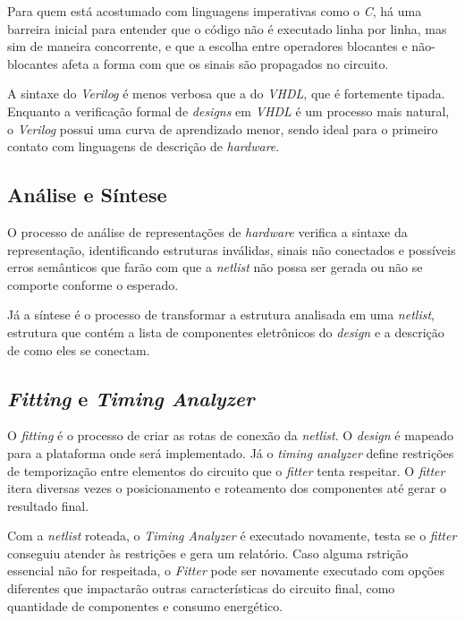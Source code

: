     { Para quem está acostumado com linguagens imperativas como o \textit{C},
        há uma barreira inicial para entender que o código não é executado linha
        por linha, mas sim de maneira concorrente, e que a escolha entre operadores
        blocantes e não-blocantes afeta a forma com que os sinais são propagados
        no circuito.
    }

    { A sintaxe do \textit{Verilog} é menos verbosa que a do \textit{VHDL}, que
        é fortemente tipada. Enquanto a verificação formal de \textit{designs}
        em \textit{VHDL} é um processo mais natural, o \textit{Verilog} possui
        uma curva de aprendizado menor, sendo ideal para o primeiro contato com
        linguagens de descrição de \textit{hardware}.
    }

    \subsection{Análise e Síntese}
    { O processo de análise de representações de \textit{hardware} verifica a
        sintaxe da representação, identificando estruturas inválidas, sinais não
        conectados e possíveis erros semânticos que farão com que a \textit{netlist}
        não possa ser gerada ou não se comporte conforme o esperado.
    }

    { Já a síntese é o processo de transformar a estrutura analisada em uma
        \textit{netlist}, estrutura que contém a lista de componentes eletrônicos
        do \textit{design} e a descrição de como eles se conectam.
    }

    \subsection{\textit{Fitting} e \textit{Timing Analyzer}}
    { O \textit{fitting} é o processo de criar as rotas de conexão da \textit{netlist}.
        O \textit{design} é mapeado para a plataforma onde será implementado.
        Já o \textit{timing analyzer} define restrições de temporização entre
        elementos do circuito que o \textit{fitter} tenta respeitar. O
        \textit{fitter} itera diversas vezes o posicionamento e roteamento dos
        componentes até gerar o resultado final.
    }

    { Com a \textit{netlist} roteada, o \textit{Timing Analyzer} é executado
        novamente, testa se o \textit{fitter} conseguiu atender às restrições e
        gera um relatório. Caso alguma rstrição essencial não for respeitada,
        o \textit{Fitter} pode ser novamente executado com opções diferentes que
        impactarão outras características do circuito final, como quantidade de
        componentes e consumo energético.
    }

